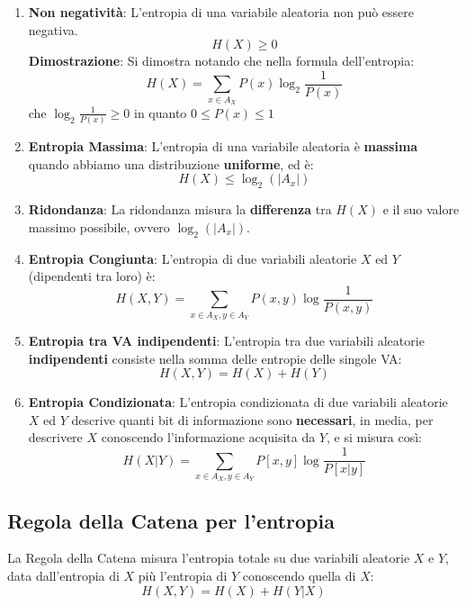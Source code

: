 \begin{enumerate}
	\item \textbf{Non negatività}: L'entropia di una variabile aleatoria non può essere negativa. 
	$$
	H(X) \geq 0 
	$$
	\textbf{Dimostrazione}: Si dimostra notando che nella formula dell'entropia:
	$$
	H(X) = \sum_{x\in A_X} P(x)\log_{2}\frac{1}{P(x)}
	$$
	che $\log_{2}\frac{1}{P(x)} \geq 0$ in quanto $0 \leq P(x) \leq 1$
	
	\item \textbf{Entropia Massima}: L'entropia di una variabile aleatoria è \textbf{massima} quando abbiamo una distribuzione \textbf{uniforme}, ed è:
	$$
	H(X) \leq \log_{2}(|A_x|)
	$$
	
	\item \textbf{Ridondanza}: La ridondanza misura la \textbf{differenza} tra $H(X)$ e il suo valore massimo possibile, ovvero $\log_{2}(|A_x|)$.
	
	\item \textbf{Entropia Congiunta}: L'entropia di due variabili aleatorie $X$ ed $Y$ (dipendenti tra loro) è:
	$$
	H(X,Y) = \sum_{x\in A_X,y\in A_Y}P(x,y) \log\frac{1}{P(x,y)}
	$$
	
	\item \textbf{Entropia tra VA indipendenti}: L'entropia tra due variabili aleatorie \textbf{indipendenti} consiste nella somma delle entropie delle singole VA:
	$$
	H(X,Y) = H(X)+H(Y)
	$$
	
	\item \textbf{Entropia Condizionata}: L'entropia condizionata di due variabili aleatorie $X$ ed $Y$ descrive quanti bit di informazione sono \textbf{necessari}, in media, per descrivere $X$ conoscendo l'informazione acquisita da $Y$, e si misura così:
	$$
	H(X|Y) = \sum_{x\in A_X,y\in A_Y}P[x,y] \log\frac{1}{P[x|y]}
	$$
\end{enumerate}

\subsection{Regola della Catena per l'entropia} 
La Regola della Catena misura l'entropia totale su due variabili aleatorie $X$ e $Y$, data dall'entropia di $X$ più l'entropia di $Y$ conoscendo quella di $X$:
\begin{equation}
	H(X,Y) = H(X) + H(Y|X)
\end{equation}

